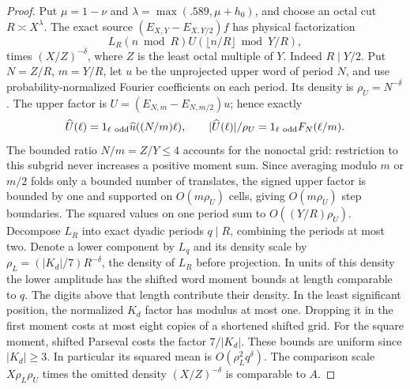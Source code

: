 \documentclass[11pt,a4paper]{article}
\theoremstyle{paperplain}
\numberwithin{equation}{section}
\begin{document}
\begin{proof}
Put $\mu=1-\nu$ and $\lambda=\max(.589,\mu+h_0)$, and choose
an octal cut $R\asymp X^\lambda$. The exact source
$(E_{X,Y}-E_{X,Y/2})f$ has physical factorization
\begin{equation}\label{eq:near-balanced-source-factorization}
   L_R(n\bmod R) U(\lfloor n/R\rfloor\bmod Y/R),
\end{equation}
times $(X/Z)^{-\delta}$, where $Z$ is the least octal multiple of $Y$.
Indeed $R\mid Y/2$. Put $N=Z/R$, $m=Y/R$, let $u$ be the
unprojected upper word of period $N$, and use probability-normalized
Fourier coefficients on each period. Its density is $\rho_U=N^{-\delta}$.
The upper factor is $U=(E_{N,m}-E_{N,m/2})u$; hence exactly
\[
 \widehat U(\ell)=1_{\ell\ {\rm odd}}\widehat u((N/m)\ell),
 \qquad |\widehat U(\ell)|/\rho_U
   =1_{\ell\ {\rm odd}}F_N(\ell/m).
\]
The bounded ratio $N/m=Z/Y\le4$ accounts for the nonoctal grid:
restriction to this subgrid never increases a positive moment sum.
Since averaging modulo $m$ or $m/2$ folds only a bounded number of
translates, the signed upper factor is bounded by one and supported
on $O(m\rho_U)$ cells, giving $O(m\rho_U)$ step boundaries.
The squared values on one period sum to $O((Y/R)\rho_U)$.
Decompose $L_R$ into exact dyadic periods $q\mid R$, combining
the periods at most two. Denote a lower component by $L_q$ and
its density scale by $\rho_L=(|K_d|/7)R^{-\delta}$, the density of
$L_R$ before projection. In units of this density the lower amplitude has the shifted word
moment bounds at length comparable to $q$. The digits above that
length contribute their density. In the least significant position,
the normalized $K_d$ factor has modulus at most one. Dropping it
in the first moment costs at most eight copies of a shortened
shifted grid. For the square moment, shifted Parseval costs the
factor $7/|K_d|$. These bounds are uniform since $|K_d|\ge3$.
In particular its squared mean is $O(\rho_L^2 q^\delta)$.
The comparison scale $X\rho_L\rho_U$ times the omitted density
$(X/Z)^{-\delta}$ is comparable to $A$.



\end{proof}
\end{document}
